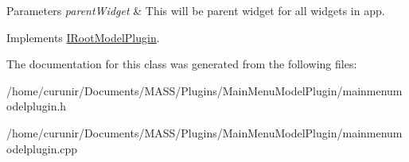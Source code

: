 \begin{DoxyParams}{Parameters}
{\em parent\+Widget} & This will be parent widget for all widgets in app. \\
\hline
\end{DoxyParams}


Implements \hyperlink{class_i_root_model_plugin_a9ee55034608480fda71b7700d3495984}{I\+Root\+Model\+Plugin}.



The documentation for this class was generated from the following files\+:\begin{DoxyCompactItemize}
\item 
/home/curunir/\+Documents/\+M\+A\+S\+S/\+Plugins/\+Main\+Menu\+Model\+Plugin/mainmenumodelplugin.\+h\item 
/home/curunir/\+Documents/\+M\+A\+S\+S/\+Plugins/\+Main\+Menu\+Model\+Plugin/mainmenumodelplugin.\+cpp\end{DoxyCompactItemize}
